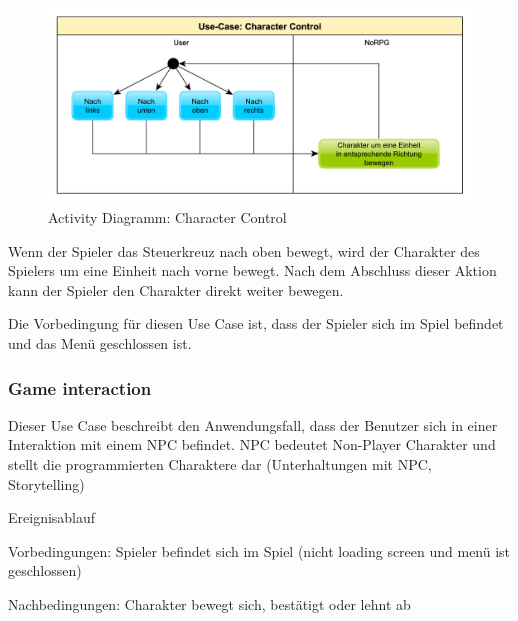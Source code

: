 			\begin{figure}[htbp]
				\centering 
				\label{umlControl}
				\includegraphics[width=13cm]{pics/CharacterControl.pdf}
				\caption{Activity Diagramm: Character Control}
			\end{figure}
		
			Wenn der Spieler das Steuerkreuz nach oben bewegt, wird der Charakter des Spielers um eine Einheit nach vorne bewegt. Nach dem Abschluss dieser Aktion kann der Spieler den Charakter direkt weiter bewegen. 
			
			Die Vorbedingung für diesen Use Case ist, dass der Spieler sich im Spiel befindet und das Menü geschlossen ist.
	
		\subsubsection{Game interaction}
			Dieser Use Case beschreibt den Anwendungsfall, dass der Benutzer sich in einer Interaktion mit einem NPC befindet. NPC bedeutet Non-Player Charakter und stellt die programmierten Charaktere dar (Unterhaltungen mit NPC, Storytelling)
			
			Ereignisablauf
			
			Vorbedingungen: Spieler befindet sich im Spiel (nicht loading screen und menü ist geschlossen)
			
			Nachbedingungen: Charakter bewegt sich, bestätigt oder lehnt ab
				
	
